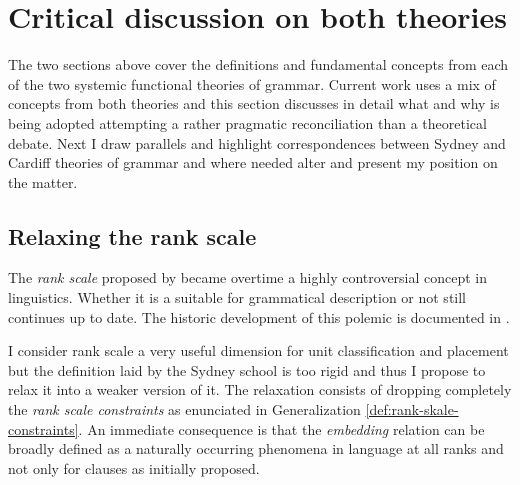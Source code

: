 \section{Critical discussion on both theories}

The two sections above cover the definitions and fundamental concepts from each of the two systemic functional theories of grammar. Current work uses a mix of concepts from both theories and this section discusses in detail what and why is being adopted attempting a rather pragmatic reconciliation than a theoretical debate. Next I draw parallels and highlight correspondences between Sydney and Cardiff theories of grammar and where needed alter and present my position on the matter. 

\subsection{Relaxing the rank scale}
\label{sec:rank-system}

The \textit{rank scale} proposed by \citet{Halliday2002} became overtime a highly controversial concept in linguistics. Whether it is a suitable for grammatical description or not still continues up to date. The historic development of this polemic is documented in \cite[p.309--338]{Fawcett2000}. %


I consider rank scale a very useful dimension for unit classification and placement but the definition laid by the Sydney school is too rigid and thus I propose to relax it into a weaker version of it. The relaxation consists of dropping completely the \textit{rank scale constraints} as enunciated in Generalization \ref{def:rank-skale-constraints}. An immediate consequence is that the \textit{embedding} relation can be broadly defined as a naturally occurring phenomena in language at all ranks and not only for clauses as initially proposed.

